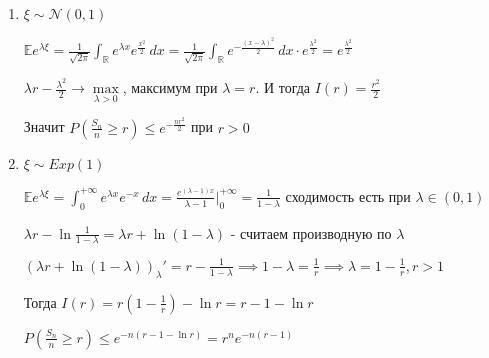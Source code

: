  \begin{example}
    \begin{enumerate}
        \item {
            $\xi \sim \mathcal{N} (0, 1)$

            $\mathbb{E} e^{\lambda \xi} = \frac{1}{\sqrt{2\pi}} \int_{\mathbb{R}} e^{\lambda x} e^{\frac{x^2}{2}} \, dx = 
            \frac{1}{\sqrt{2\pi}} \int_{\mathbb{R}} e^{-\frac{(x - \lambda)^2}{2}} \, dx \cdot e^{\frac{\lambda^2}{2}} = e^{\frac{\lambda^2}{2}}$
            
            $\lambda r - \frac{\lambda^2}{2} \rightarrow \max\limits_{\lambda > 0}$, максимум при $\lambda = r$. И тогда $I(r) = \frac{r^2}{2}$

            Значит $P \left( \frac{S_n}{n} \geqslant r \right) \leqslant e^{-\frac{nr^2}{2}}$ при $r > 0$
        }
        \item {
            $\xi \sim Exp(1)$

            $\mathbb{E} e^{\lambda \xi} = \int_0^{+\infty} e^{\lambda x} e^{-x} \, dx = \frac{e^{(\lambda - 1)x}}{\lambda - 1} \bigg |_0^{+\infty} = \frac{1}{1 - \lambda}$ сходимость есть при $\lambda \in (0, 1)$

            $\lambda r - \ln \frac{1}{1 - \lambda} = \lambda r + \ln (1 - \lambda)$ - считаем производную по $\lambda$

            $(\lambda r + \ln (1 - \lambda))_\lambda' = r - \frac{1}{1 - \lambda} \implies 1 - \lambda = \frac{1}{r} \implies \lambda = 1 - \frac{1}{r}, r > 1$

            Тогда $I(r) = r (1 - \frac{1}{r}) - \ln r = r - 1 - \ln r$

            $P \left( \frac{S_n}{n} \geqslant r \right) \leqslant e^{-n (r -1 - \ln r)} = r^n e^{-n (r - 1)}$
        }
    \end{enumerate}
 \end{example}